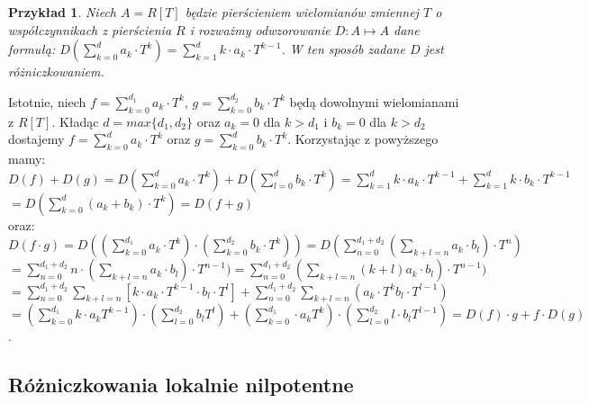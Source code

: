 \documentclass[12pt,a4paper]{article}
\newtheorem{exs}[ex]{Przykład}
\numberwithin{equation}{section}
\begin{document}
\begin{exs}
Niech $A=R[T]$ będzie pierścieniem wielomianów zmiennej $T$ o współczynnikach z pierścienia $R$ i rozważmy odwzorowanie $D: A \mapsto A$ dane formułą: 
$\displaystyle D(\sum_{k=0}^{d}a_{k} \cdot T^{k})=\sum_{k=1}^{d}k \cdot a_{k} \cdot T^{k-1}$. W ten sposób zadane $D$ jest różniczkowaniem.
\end{exs}

Istotnie, niech 
$\displaystyle f=\sum_{k=0}^{d_{1}}a_{k} \cdot T^{k}$, $\displaystyle g=\sum_{k=0}^{d_{2}}b_{k} \cdot T^{k}$ będą dowolnymi wielomianami z $R[T]$. Kładąc $d=max\{d_{1},d_{2}\}$ oraz $a_{k}=0$ dla $k>d_{1}$ i $b_{k}=0$ dla $k>d_{2}$ dostajemy
$\displaystyle f=\sum_{k=0}^{d}a_{k} \cdot T^{k}$
oraz
$\displaystyle g=\sum_{k=0}^{d}b_{k} \cdot T^{k}$.
Korzystając z powyższego mamy:
\\$\displaystyle D(f)+D(g)=D(\sum_{k=0}^{d}a_{k} \cdot T^{k})+D(\sum_{l=0}^{d}b_{k} \cdot T^{k})
=\sum_{k=1}^{d}k \cdot a_{k} \cdot T^{k-1}+\sum_{k=1}^{d}k \cdot b_{k} \cdot T^{k-1}$\\$
\displaystyle=D(\sum_{k=0}^{d}(a_{k}+b_{k})\cdot T^{k}) 
=D(f+g)$\\
oraz:\\
$\displaystyle D(f \cdot g) =D ((\sum_{k=0}^{d_{1}}a_{k} \cdot T^{k}) \cdot (\sum_{k=0}^{d_{2}}b_{k} \cdot T^{k}))=D(\sum_{n=0}^{d_{1}+d_{2}}(\sum_{k+l=n} a_{k} \cdot b_{l} ) \cdot T^{n})$\\$
\displaystyle=\sum_{n=0}^{d_{1}+d_{2}} n \cdot (\sum_{k+l=n}a_{k} \cdot b_{l}) \cdot T^{n-1})
=\sum_{n=0}^{d_{1}+d_{2}} (\sum_{k+l=n}
(k+l)a_{k} \cdot b_{l}) \cdot T^{n-1})$\\$
\displaystyle=\sum_{n=0}^{d_{1}+d_{2}} \sum_{k+l=n}
[k \cdot a_{k} \cdot T^{k-1} \cdot b_{l} \cdot T^{l}]+ \sum_{n=0}^{d_{1}+d_{2}} \sum_{k+l=n}
(a_{k} \cdot T^{k} b_{l} \cdot T^{l-1})$\\$
\displaystyle= (\sum_{k=0}^{d_{1}} k \cdot a_{k}T^{k-1} ) \cdot (\sum_{l=0}^{d_{2}}b_{l}T^{l})+(\sum_{k=0}^{d_{1}} \cdot a_{k} T^{k} ) \cdot (\sum_{l=0}^{d_{2}} l \cdot b_{l}T^{l-1})=D(f) \cdot g +f \cdot D(g)$.


\subsection{Różniczkowania lokalnie nilpotentne}
\end{document}
